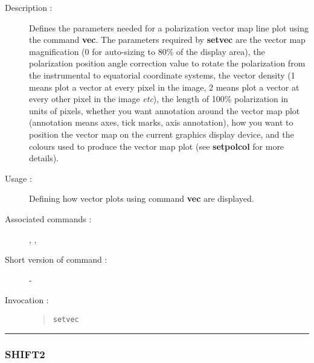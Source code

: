 \begin{description}

\item[Description :] Defines the parameters needed for a polarization
vector map line plot using the command {\bf vec}.  The parameters
required by {\bf setvec} are the vector map magnification (0 for
auto-sizing to 80\% of the display area), the polarization position
angle correction value to rotate the polarization from the instrumental
to equatorial coordinate systems, the vector density (1 means plot a
vector at every pixel in the image, 2 means plot a vector at every
other pixel in the image \emph{etc}), the length of 100\% polarization
in units of pixels, whether you want annotation around the vector map
plot (annotation means axes, tick marks, axis annotation), how you want
to position the vector map on the current graphics display device, and
the colours used to produce the vector map plot (see {\bf setpolcol}
for more details).

\item[Usage :] Defining how vector plots using command {\bf vec} are displayed.

\item[Associated commands :] {\tt {}},
{\tt {}}, {\tt {}}

\item[Short version of command :] -
\item[Invocation :]

\begin{quote}{\tt  setvec }\end{quote}

\end{description}

\hrule
\subsubsection*{\label{SHIFT2}SHIFT2}

